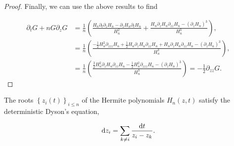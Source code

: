 \begin{proof}
    Finally, we can use the above results to find

    \begin{align*}
        \partial_t G + n G\partial_z G &= \frac1n\left(\frac{ H_n \partial_t \partial_z H_n - \partial_z H_n \partial_t H_n }{H_n^2} + \frac{H_n\partial_z H_n \partial_{zz}H_n - (\partial_z H_n)^3}{H_n^3} \right),\\ 
        &= \frac1n\left( \frac{ -\frac12H_n^2 \partial_{zzz} H_n + \frac12H_n\partial_z H_n \partial_{zz} H_n + H_n\partial_z H_n \partial_{zz}H_n - (\partial_z H_n)^3}{H_n^3} \right), \\ 
        &= \frac1n\left( \frac{\frac32 H_n^2 \partial_{z}H_n\partial_{zz}H_n - \frac12H_n^2\partial_{zzz}H_n - (\partial_z H_n)^3}{H_n^3} \right) = -\frac12 \partial_{zz}G.
    \end{align*}
\end{proof}



\begin{corollary}
    The roots $\left\{z_i(t)\right\}_{i\le n}$ of the Hermite polynomials $H_n(z,t)$ satisfy the deterministic Dyson's equation,

    \begin{equation*}
        \mathrm d z_i = \sum_{k\neq i} \frac{\mathrm d t}{z_{i} - z_k}.
    \end{equation*}
\end{corollary}

